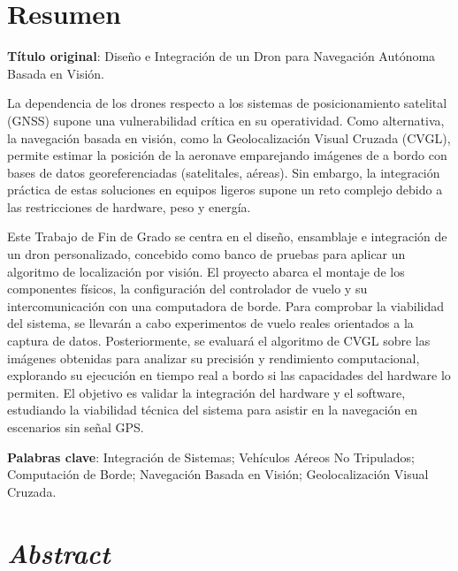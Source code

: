 
\section*{Resumen}

\noindent\textbf{Título original}: Diseño e Integración de un Dron para Navegación Autónoma Basada en Visión.

La dependencia de los drones respecto a los sistemas de posicionamiento satelital (GNSS) supone una vulnerabilidad crítica en su operatividad. Como alternativa, la navegación basada en visión, como la Geolocalización Visual Cruzada (CVGL), permite estimar la posición de la aeronave emparejando imágenes de a bordo con bases de datos georeferenciadas (satelitales, aéreas). Sin embargo, la integración práctica de estas soluciones en equipos ligeros supone un reto complejo debido a las restricciones de hardware, peso y energía.

Este Trabajo de Fin de Grado se centra en el diseño, ensamblaje e integración de un dron personalizado, concebido como banco de pruebas para aplicar un algoritmo de localización por visión. El proyecto abarca el montaje de los componentes físicos, la configuración del controlador de vuelo y su intercomunicación con una computadora de borde. Para comprobar la viabilidad del sistema, se llevarán a cabo experimentos de vuelo reales orientados a la captura de datos. Posteriormente, se evaluará el algoritmo de CVGL sobre las imágenes obtenidas para analizar su precisión y rendimiento computacional, explorando su ejecución en tiempo real a bordo si las capacidades del hardware lo permiten. El objetivo es validar la integración del hardware y el software, estudiando la viabilidad técnica del sistema para asistir en la navegación en escenarios sin señal GPS.

\textbf{Palabras clave}: Integración de Sistemas; Vehículos Aéreos No Tripulados; Computación de Borde; Navegación Basada en Visión; Geolocalización Visual Cruzada.

\clearpage

\section*{\textit{Abstract}}

